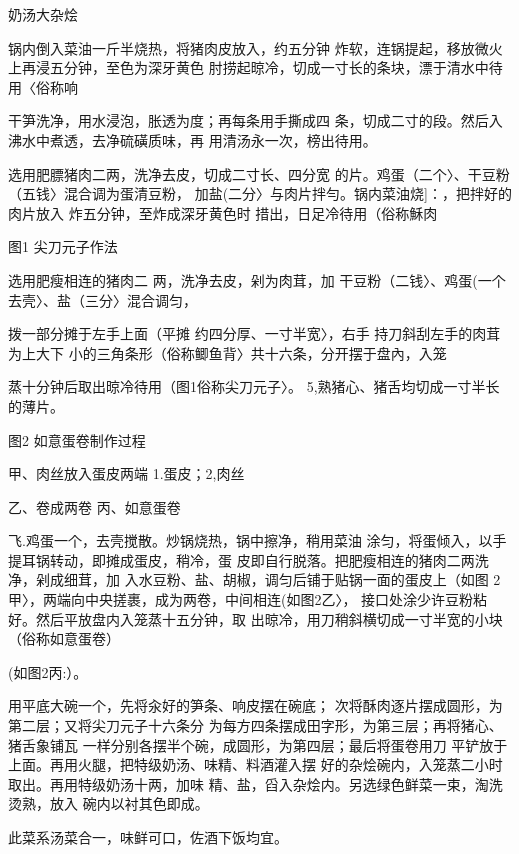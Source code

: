 \begin{recipe}{奶汤大杂烩}

\ingredients



\cooking

\step 	锅内倒入菜油一斤半烧热，将猪肉皮放入，约五分钟 炸软，连锅提起，移放微火上再浸五分钟，至色为深牙黄色 肘捞起晾冷，切成一寸长的条块，漂于清水中待用〈俗称响

\step 

\step 	干笋洗净，用水浸泡，胀透为度；再每条用手撕成四 条，切成二寸的段。然后入沸水中煮透，去净硫磺质味，再 用清汤永一次，榜出待用。

\step 	选用肥膘猪肉二两，洗净去皮，切成二寸长、四分宽 的片。鸡蛋（二个〉、干豆粉（五钱〉混合调为蛋清豆粉， 加盐(二分〉与肉片拌勻。锅内菜油烧]：，把拌好的肉片放入 炸五分钟，至炸成深牙黄色时 措出，日足冷待用（俗称穌肉

图1 尖刀元子作法

选用肥瘦相连的猪肉二 两，洗净去皮，剁为肉茸，加 干豆粉（二钱〉、鸡蛋(一个 去壳〉、盐（三分〉混合调匀，

拨一部分摊于左手上面（平摊 约四分厚、一寸半宽〉，右手 持刀斜刮左手的肉茸为上大下 小的三角条形（俗称鲫鱼背〉共十六条，分开摆于盘內，入笼

蒸十分钟后取出晾冷待用（图1俗称尖刀元子〉。 5,熟猪心、猪舌均切成一寸半长的薄片。

图2 如意蛋卷制作过程

甲、肉丝放入蛋皮两端 1.蛋皮；2,肉丝

乙、卷成两卷 丙、如意蛋卷

飞.鸡蛋一个，去壳搅散。炒锅烧热，锅中擦净，稍用菜油 涂匀，将蛋倾入，以手提耳锅转动，即摊成蛋皮，稍冷，蛋 皮即自行脱落。把肥瘦相连的猪肉二两洗净，剁成细茸，加 入水豆粉、盐、胡椒，调匀后铺于贴锅一面的蛋皮上（如图 2甲〉，两端向中央搓裹，成为两卷，中间相连(如图2乙〉， 接口处涂少许豆粉粘好。然后平放盘内入笼蒸十五分钟，取 出晾冷，用刀稍斜横切成一寸半宽的小块（俗称如意蛋卷）

(如图2丙:）。

\step 用平底大碗一个，先将汆好的笋条、响皮摆在碗底； 次将酥肉逐片摆成圆形，为第二层；又将尖刀元子十六条分 为每方四条摆成田字形，为第三层；再将猪心、猪舌象铺瓦 一样分别各摆半个碗，成圆形，为第四层；最后将蛋卷用刀 平铲放于上面。再用火腿，把特级奶汤、味精、料酒灌入摆 好的杂烩碗内，入笼蒸二小时取出。再用特级奶汤十两，加味 精、盐，舀入杂烩内。另选绿色鲜菜一束，淘洗烫熟，放入 碗内以衬其色即成。

\notes

此菜系汤菜合一，味鲜可口，佐酒下饭均宜。

\end{recipe}

